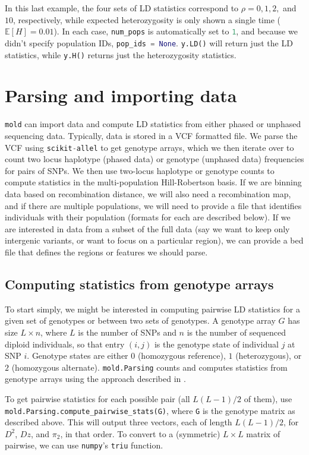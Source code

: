 \documentclass[10pt]{article}
\makeatletter
\newcommand{\mold}{\texttt{mold}\xspace}
\newcommand{\py}[1]{\lstinline[breaklines=true,language=Python, showstringspaces=False]@#1@}
\newcommand{\E}{\mathbb{E}}
\makeatother
\begin{document}
In this last example, the four sets of LD statistics correspond to $\rho=0,1,2,$ and $10$, respectively, while expected heterozygosity is only shown a single time ($\E[H]=0.01$).
In each case, \py{num_pops} is automatically set to \py{1}, and because we didn't specify population IDs, \py{pop_ids = None}.
\py{y.LD()} will return just the LD statistics, while \py{y.H()} returns just the heterozygosity statistics.



\section{Parsing and importing data}

\mold can import data and compute LD statistics from either phased or unphased sequencing data.
Typically, data is stored in a VCF formatted file.
We parse the VCF using \py{scikit-allel} to get genotype arrays, which we then iterate over to count two locus haplotype (phased data) or genotype (unphased data) frequencies for pairs of SNPs.
We then use two-locus haplotype or genotype counts to compute statistics in the multi-population Hill-Robertson basis.
If we are binning data based on recombination distance, we will also need a recombination map, and if there are multiple populations, we will need to provide a file that identifies individuals with their population (formats for each are described below).
If we are interested in data from a subset of the full data (say we want to keep only intergenic variants, or want to focus on a particular region), we can provide a bed file that defines the regions or features we should parse.

\subsection{Computing statistics from genotype arrays}
To start simply, we might be interested in computing pairwise LD statistics for a given set of genotypes or between two sets of genotypes.
A genotype array $G$ has size $L\times n$, where $L$ is the number of SNPs and $n$ is the number of sequenced diploid individuals, so that entry $(i,j)$ is the genotype state of individual $j$ at SNP $i$.
Genotype states are either $0$ (homozygous reference), $1$ (heterozygous), or $2$ (homozygous alternate).
\py{mold.Parsing} counts and computes statistics from genotype arrays using the approach described in \citet{Ragsdale2019}.

To get pairwise statistics for each possible pair (all $L(L-1)/2$ of them), use \py{mold.Parsing.compute_pairwise_stats(G)}, where \py{G} is the genotype matrix as described above.
This will output three vectors, each of length $L(L-1)/2$, for $D^2$, $Dz$, and $\pi_2$, in that order.
To convert to a (symmetric) $L\times L$ matrix of pairwise, we can use \py{numpy}'s \py{triu} function.
\end{document}
